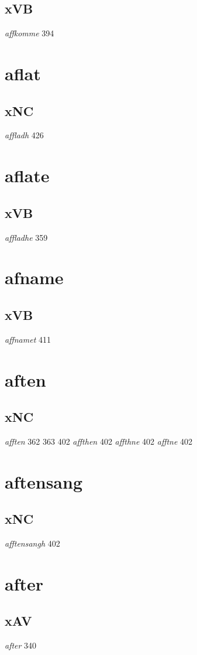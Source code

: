 \documentclass[a4paper,twocolumn]{article}
\begin{document}
\subsection{xVB}
\label{sec:org7652219}
\emph{affkomme} 394 
\section{aflat}
\label{sec:org36807f6}
\subsection{xNC}
\label{sec:org7bbdaeb}
\emph{affladh} 426 
\section{aflate}
\label{sec:org91ed03b}
\subsection{xVB}
\label{sec:org014ad36}
\emph{affladhe} 359 
\section{afname}
\label{sec:orgee8798b}
\subsection{xVB}
\label{sec:org413d36c}
\emph{affnamet} 411 
\section{aften}
\label{sec:org6ef1a7d}
\subsection{xNC}
\label{sec:orgdd7d7bb}
\emph{afften} 362 363 402 \emph{affthen} 402 \emph{affthne} 402 \emph{afftne} 402 
\section{aftensang}
\label{sec:org39ff9fb}
\subsection{xNC}
\label{sec:org56bd1b0}
\emph{afftensangh} 402 
\section{after}
\label{sec:org8071796}
\subsection{xAV}
\label{sec:orgb39db73}
\emph{after} 340 
\end{document}
